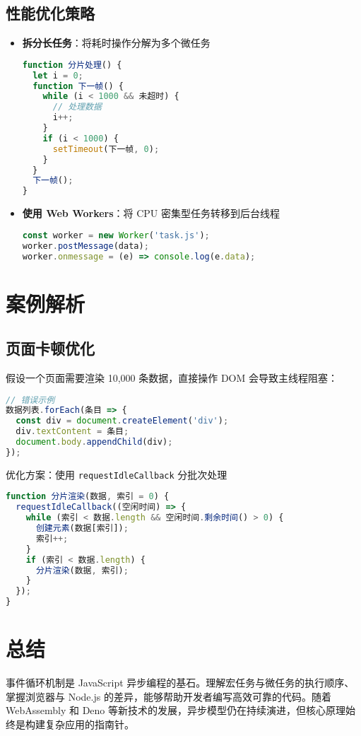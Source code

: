 \section{性能优化策略}
\begin{itemize}
\item \textbf{拆分长任务}：将耗时操作分解为多个微任务\begin{lstlisting}[language=javascript]
function 分片处理() {
  let i = 0;
  function 下一帧() {
    while (i < 1000 && 未超时) {
      // 处理数据
      i++;
    }
    if (i < 1000) {
      setTimeout(下一帧, 0);
    }
  }
  下一帧();
}
\end{lstlisting}

\item \textbf{使用 Web Workers}：将 CPU 密集型任务转移到后台线程\begin{lstlisting}[language=javascript]
const worker = new Worker('task.js');
worker.postMessage(data);
worker.onmessage = (e) => console.log(e.data);
\end{lstlisting}

\end{itemize}
\chapter{案例解析}
\section{页面卡顿优化}
假设一个页面需要渲染 10,000 条数据，直接操作 DOM 会导致主线程阻塞：\par
\begin{lstlisting}[language=javascript]
// 错误示例
数据列表.forEach(条目 => {
  const div = document.createElement('div');
  div.textContent = 条目;
  document.body.appendChild(div);
});
\end{lstlisting}
优化方案：使用 \verb!requestIdleCallback! 分批次处理\par
\begin{lstlisting}[language=javascript]
function 分片渲染(数据, 索引 = 0) {
  requestIdleCallback((空闲时间) => {
    while (索引 < 数据.length && 空闲时间.剩余时间() > 0) {
      创建元素(数据[索引]);
      索引++;
    }
    if (索引 < 数据.length) {
      分片渲染(数据, 索引);
    }
  });
}
\end{lstlisting}
\chapter{总结}
事件循环机制是 JavaScript 异步编程的基石。理解宏任务与微任务的执行顺序、掌握浏览器与 Node.js 的差异，能够帮助开发者编写高效可靠的代码。随着 WebAssembly 和 Deno 等新技术的发展，异步模型仍在持续演进，但核心原理始终是构建复杂应用的指南针。\par
